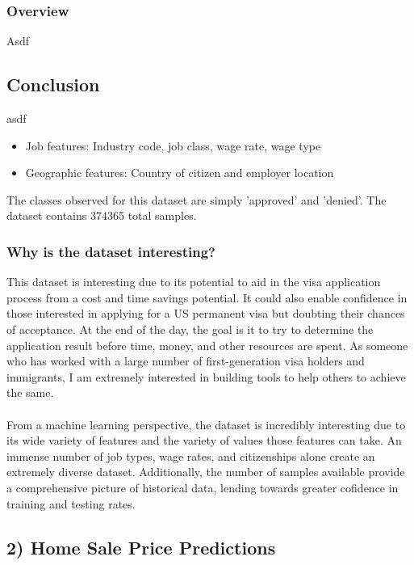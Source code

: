 \documentclass[h]{article}
\begin{document}
\subsubsection*{Overview}
Asdf

\subsection*{ Conclusion}  
asdf

\begin{itemize}
  \item Job features: Industry code, job class, wage rate, wage type
  \item Geographic features: Country of citizen and employer location
\end{itemize}
The classes observed for this dataset are simply 'approved' and 'denied'.  The 
dataset contains 374365 total samples.
\subsubsection*{Why is the dataset interesting?}
This dataset is interesting due to its potential to aid in the visa application 
process from a cost and time savings potential.  It could also enable confidence in those 
interested in applying for a US permanent visa but doubting their chances of 
acceptance.  At the end of the day, the goal is it to try to determine the application result 
before time, money, and other resources are spent.  As someone who has worked 
with a large number of first-generation visa holders and immigrants, I am 
extremely interested in building tools to help others to achieve the same.
\\ \\
From a machine learning perspective, the dataset is incredibly interesting due 
to its wide variety of features and the variety of values those features can take. 
 An immense number of job types, wage rates, and citizenships alone create an 
 extremely diverse dataset.  Additionally, the number of samples available 
 provide a comprehensive picture of historical data, lending towards greater 
 cofidence in training and testing rates.

\subsection*{2) Home Sale Price Predictions}  
\end{document}

